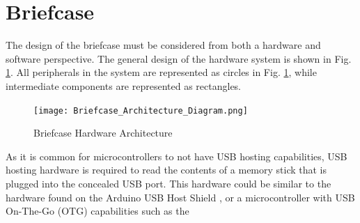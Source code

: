 \section{Briefcase}
The design of the briefcase must be considered from both a hardware and software perspective. The general design of the hardware system is shown in Fig. \ref{fig:briefcase_architecture}. All peripherals in the system are represented as circles in Fig. \ref{fig:briefcase_architecture}, while intermediate components are represented as rectangles.
\begin{figure}[h]
    \centering
    \texttt{[image: Briefcase\_Architecture\_Diagram.png]}
    \caption{Briefcase Hardware Architecture}
    \label{fig:briefcase_architecture}
\end{figure}

As it is common for microcontrollers to not have USB hosting capabilities, USB hosting hardware is required to read the contents of a memory stick that is plugged into the concealed USB port. This hardware could be similar to the hardware found on the Arduino USB Host Shield \cite{arduinoUSBHost}, or a microcontroller with USB On-The-Go (OTG) capabilities \cite{techopediaUSBOTG} such as the 